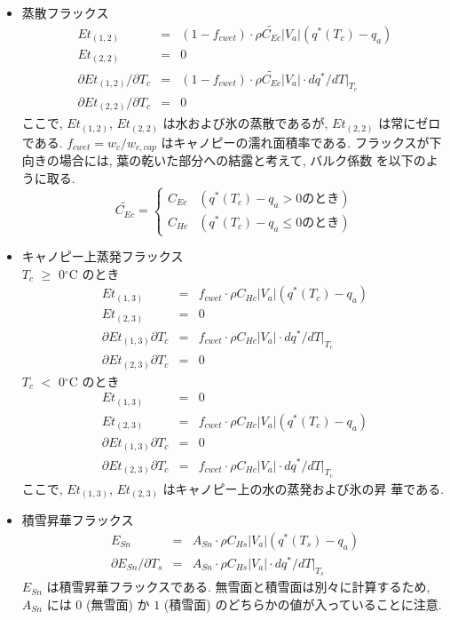 \begin{itemize}
\item 蒸散フラックス
 \begin{eqnarray}
 Et_{(1,2)} &=& (1-f_{cwet}) \cdot \rho \widetilde{C_{Ec}}|V_a|(q^*(T_c) - q_a) \\
 Et_{(2,2)} &=& 0 \\
 \partial Et_{(1,2)}/\partial T_c &=& 
  (1-f_{cwet}) \cdot \rho \widetilde{C_{Ec}}|V_a|\cdot dq^*/dT|_{T_c} \\
 \partial Et_{(2,2)}/\partial T_c &=& 0
 \end{eqnarray}
ここで, $Et_{(1,2)}$, $Et_{(2,2)}$ は水および氷の蒸散であるが,
$Et_{(2,2)}$ は常にゼロである. 
$f_{cwet} = w_c / w_{c,cap}$ はキャノピーの濡れ面積率である. 
フラックスが下向きの場合には, 葉の乾いた部分への結露と考えて, バルク係数
を以下のように取る. 
 \begin{equation}
  \widetilde{C_{Ec}} = \left\{
  \begin{array}{ll}
   C_{Ec}& (q^*(T_c) - q_a > 0 \mbox{のとき})\\
   C_{Hc}& (q^*(T_c) - q_a \leq 0 \mbox{のとき})
  \end{array}
  \right.
 \end{equation}

\item キャノピー上蒸発フラックス \\
%
$T_c$ $\geq$ 0$^{\circ}$C のとき
 \begin{eqnarray}
 Et_{(1,3)} &=& 
  f_{cwet} \cdot \rho C_{Hc}|V_a|(q^*(T_c) - q_a) \\
 Et_{(2,3)} &=& 0 \\
 \partial Et_{(1,3)} \partial T_c &=& 
  f_{cwet} \cdot \rho C_{Hc}|V_a|\cdot dq^*/dT|_{T_c} \\
 \partial Et_{(2,3)} \partial T_c &=& 0 
 \end{eqnarray}
$T_c$ $<$ 0$^{\circ}$C のとき
 \begin{eqnarray}
 Et_{(1,3)} &=& 0 \\
 Et_{(2,3)} &=& 
  f_{cwet} \cdot \rho C_{Hc}|V_a|(q^*(T_c) - q_a) \\
 \partial Et_{(1,3)} \partial T_c &=& 0 \\
 \partial Et_{(2,3)} \partial T_c &=& 
  f_{cwet} \cdot \rho C_{Hc}|V_a|\cdot dq^*/dT|_{T_c}
 \end{eqnarray}
ここで, $Et_{(1,3)}$, $Et_{(2,3)}$ はキャノピー上の水の蒸発および氷の昇
華である. 

\item 積雪昇華フラックス
 \begin{eqnarray}
 E_{Sn} &=& A_{Sn}\cdot \rho C_{Hs}|V_a|(q^*(T_s) - q_a) \\
 \partial E_{Sn}/\partial T_s &=& A_{Sn}\cdot \rho C_{Hs}|V_a|
 \cdot dq^*/dT|_{T_s}
 \end{eqnarray}
$E_{Sn}$ は積雪昇華フラックスである. 
無雪面と積雪面は別々に計算するため, $A_{Sn}$ には $0$ (無雪面) か $1$
(積雪面) のどちらかの値が入っていることに注意. 
\end{itemize}

